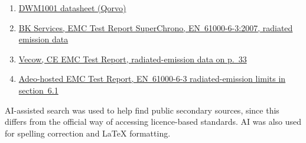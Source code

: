 \begin{enumerate}
  \item \label{ref:dwm1001-datasheet} \href{https://store.qorvo.com/datasheets/qorvo/dwm1001datasheet.pdf}{DWM1001 datasheet (Qorvo)}
  \item \label{ref:bk-superchrono} \href{https://www.steinertsensingsystems.com/wp-content/uploads/2013/06/Certificate-of-Compliance-CE-FCC-SuperChrono-1.pdf}{BK Services, EMC Test Report SuperChrono, EN~61000-6-3:2007, radiated emission data}
  \item \label{ref:vecow-ce-emc} \href{https://www.vecow.com/dispUploadBox/PJ-VECOW/Files/10276.pdf}{Vecow, CE EMC Test Report, radiated-emission data on p.~33}
  \item \label{ref:adeo-emc} \href{https://media.adeo.com/media/1320160/media.pdf}{Adeo-hosted EMC Test Report, EN~61000-6-3 radiated-emission limits in section~6.1}
\end{enumerate}

AI-assisted search was used to help find public secondary sources, since this differs from
the official way of accessing licence-based standards. AI was also used for spelling
correction and \LaTeX{} formatting.

